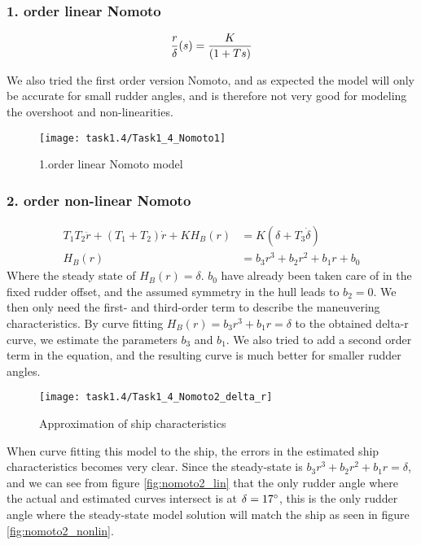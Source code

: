 \newpage
\subsubsection*{1. order linear Nomoto}

\begin{equation}
	\frac{r}{\delta}(s) = \frac{K}{(1+Ts) } \\
\end{equation}

We also tried the first order version Nomoto, and as expected the model will only be accurate for small rudder angles, and is therefore not very good for modeling the overshoot and non-linearities.

\begin{figure}[H]
    \centering
    \texttt{[image: task1.4/Task1\_4\_Nomoto1]}
    \caption{1.order linear Nomoto model}
    \label{fig:nomoto1_lin}
\end{figure}

\newpage
\subsubsection*{2. order non-linear Nomoto}
\begin{equation}
\begin{split}
	T_1 T_2 \ddot{r} + (T_1 + T_2)\dot{r} + KH_B(r) &= K(\delta + T_3\dot{\delta}) \\
	H_B(r) &= b_3r^3 + b_2r^2 + b_1r + b_0
\end{split}
\end{equation}
Where the steady state of $H_B(r)=\delta$. $b_0$ have already been taken care of in the fixed rudder offset, and the assumed symmetry in the hull leads to $b_2 = 0$. We then only need the first- and third-order term to describe the maneuvering characteristics. By curve fitting $H_B(r)=b_3r^3 + b_1r=\delta$ to the obtained delta-r curve, we estimate the parameters $b_3$ and $b_1$. We also tried to add a second order term in the equation, and the resulting curve is much better for smaller rudder angles.
\begin{figure}[H]
    \centering
    \texttt{[image: task1.4/Task1\_4\_Nomoto2\_delta\_r]}
    \caption{Approximation of ship characteristics}
    \label{fig:nomoto2_delta_r}
\end{figure}

When curve fitting this model to the ship, the errors in the estimated ship characteristics becomes very clear. Since the steady-state is $b_3 r^3 + b_2 r^2 + b_1 r = \delta$, and we can see from figure \ref{fig:nomoto2_lin} that the only rudder angle where the actual and estimated curves intersect is at $\delta = 17\degree$, this is the only rudder angle where the steady-state model solution will match the ship as seen in figure \ref{fig:nomoto2_nonlin}.
    
